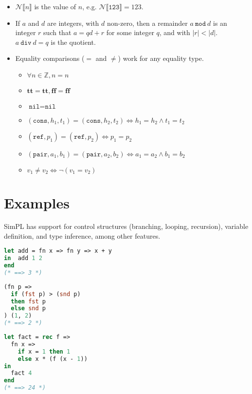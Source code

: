\documentclass{article}
\newcommand{\btt}{\mathbf{tt}}
\newcommand{\bff}{\mathbf{ff}}
\begin{document}
\begin{itemize}
  \item $\mathcal{N}\llbracket n\rrbracket$ is the value of $n$, e.g. $\mathcal{N}\llbracket\texttt{123}\rrbracket = 123$.
  \item If $a$ and $d$ are integers, with $d$ non-zero, then a remainder $a\ \texttt{mod}\ d$ is an integer $r$ such that $a = qd + r$ for some integer $q$, and with $|r| < |d|$.  $a\ \texttt{div}\ d = q$ is the quotient.
  \item Equality comparisons ($=$ and $\ne$) work for any equality type.
  \begin{itemize}
    \item $\forall n\in\mathbb{Z}, n=n$
    \item $\btt=\btt, \bff=\bff$
    \item $\texttt{nil}=\texttt{nil}$
    \item $(\texttt{cons},h_1,t_1)=(\texttt{cons},h_2,t_2) \iff h_1=h_2\land t_1=t_2$
    \item $(\texttt{ref},p_1)=(\texttt{ref},p_2) \iff p_1=p_2$
    \item $(\texttt{pair},a_1,b_1)=(\texttt{pair},a_2,b_2) \iff a_1=a_2\land b_1=b_2$
    \item $v_1\ne v_2 \iff \lnot(v_1=v_2)$
  \end{itemize}
\end{itemize}

\section{Examples}
SimPL has support for control structures (branching, looping, recursion), variable definition, and type inference, among other features.

\begin{lstlisting}[language=ML]
let add = fn x => fn y => x + y
in  add 1 2
end
(* ==> 3 *)
\end{lstlisting}

\begin{lstlisting}[language=ML]
(fn p =>
  if (fst p) > (snd p)
  then fst p
  else snd p
) (1, 2)
(* ==> 2 *)
\end{lstlisting}


\begin{lstlisting}[language=ML]
let fact = rec f =>
  fn x =>
    if x = 1 then 1
    else x * (f (x - 1))
in
  fact 4
end
(* ==> 24 *)
\end{lstlisting}
\end{document}
